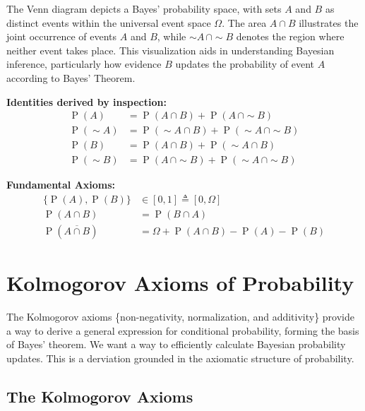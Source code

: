 \documentclass[
  12 pt,
  a4paper,
]{book}
\numberwithin{equation}{section}
\theoremstyle{plain}      %
\theoremstyle{definition} %
\theoremstyle{remark}     %
\theoremstyle{note}         %
\begin{document}
The Venn diagram depicts a Bayes' probability space, with sets \(A\) and
\(B\) as distinct events within the universal event space \(\Omega\).
The area \(A \cap B\) illustrates the joint occurrence of events \(A\)
and \(B\), while \(\sim\! A \, \cap \sim\! B\) denotes the region where
neither event takes place. This visualization aids in understanding
Bayesian inference, particularly how evidence \(B\) updates the
probability of event \(A\) according to Bayes' Theorem.

\textbf{Identities derived by inspection:} \[\begin{aligned} 
\operatorname{P}(A) &=\operatorname{P}(A \cap B)+\operatorname{P}(A\, \cap \sim B) \\ 
\operatorname{P}(\sim A)&=\operatorname{P}(\sim A \cap B)+\operatorname{P}(\sim A\, \cap \sim B) \\ 
\operatorname{P}(B)&=\operatorname{P}(A \cap B)+\operatorname{P}(\sim A \cap B) \\ 
\operatorname{P}(\sim B)&=\operatorname{P}(A\, \cap \sim B)+\operatorname{P}(\sim A\, \cap \sim B)
\end{aligned}\]

\textbf{Fundamental Axioms:} \[\begin{aligned}
\{\operatorname{P}(A), \operatorname{P}(B)\} &\in[0,1] \triangleq [0 , \Omega] \\ 
\operatorname{P}(A \cap B)&=\operatorname{P}(B \cap A)\\
\operatorname{P}(\overline{A \cap B}) &= \Omega + \operatorname{P}(A \cap B) - \operatorname{P}(A) - \operatorname{P}(B)
\end{aligned}\]

\newpage

\newpage

\hypertarget{kolmogorov-axioms-of-probability}{%
\section{Kolmogorov Axioms of
Probability}\label{kolmogorov-axioms-of-probability}}

The Kolmogorov axioms \{non-negativity, normalization, and additivity\}
provide a way to derive a general expression for conditional
probability, forming the basis of Bayes' theorem. We want a way to
efficiently calculate Bayesian probability updates. This is a derviation
grounded in the axiomatic structure of probability.

\hypertarget{the-kolmogorov-axioms}{%
\subsection{The Kolmogorov Axioms}\label{the-kolmogorov-axioms}}
\end{document}
